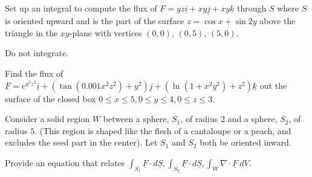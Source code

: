\documentclass[12pt,letterpaper,noanswers]{exam}
\newcommand{\mb}[1]{\underline{#1}}
\begin{document}
 \pdfpageheight 11in 
  \pdfpagewidth 8.5in



\begin{questions}
\question Set up an integral to compute the flux of $\mb F = yz\mb i + xy\mb j + xy\mb k$ through $S$ where $S$ is oriented upward and is the part of the surface $z = \cos x + \sin 2y$ above the triangle in the $xy$-plane with vertices $(0,0)$, $(0,5)$, $(5,0)$.

Do not integrate.

\vfill

\item 
Find the flux of $\underline F = e^{y^2z^2}\mb i + (\tan(0.001x^2z^2)+y^2)\mb j + (\ln(1+x^2y^2)+z^2)\mb k$ out the surface of the closed box $0\leq x \leq 5, 0\leq y \leq 4, 0\leq z \leq 3$.

\vfill

\question Consider a solid region $W$ between a sphere, $S_1$, of radius $2$ and a sphere, $S_2$, of radius $5$.  (This region is shaped like the flesh of a cantaloupe or a peach, and excludes the seed part in the center).  Let $S_1$ and $S_2$ both be oriented inward.

Provide an equation that relates $\displaystyle\int_{S_1}\mb F\cdot d\mb S,\int_{S_2}\mb F\cdot d\mb S,\int_{W}\nabla \cdot \mb F\ dV$.

\vfill

\end{questions}
\end{document}

